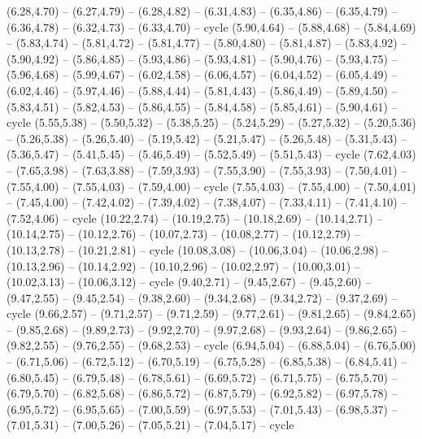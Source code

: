 \expandafter\def\csname geo:gebiet:DNK\endcsname{
  (6.28,4.70) -- (6.27,4.79) -- (6.28,4.82) -- (6.31,4.83) -- (6.35,4.86) -- (6.35,4.79) -- (6.36,4.78) -- (6.32,4.73) -- (6.33,4.70) -- cycle}
\expandafter\def\csname geo:gebiet:GBR\endcsname{
  (5.90,4.64) -- (5.88,4.68) -- (5.84,4.69) -- (5.83,4.74) -- (5.81,4.72) -- (5.81,4.77) -- (5.80,4.80) -- (5.81,4.87) -- (5.83,4.92) -- (5.90,4.92) -- (5.86,4.85) -- (5.93,4.86) -- (5.93,4.81) -- (5.90,4.76) -- (5.93,4.75) -- (5.96,4.68) -- (5.99,4.67) -- (6.02,4.58) -- (6.06,4.57) -- (6.04,4.52) -- (6.05,4.49) -- (6.02,4.46) -- (5.97,4.46) -- (5.88,4.44) -- (5.81,4.43) -- (5.86,4.49) -- (5.89,4.50) -- (5.83,4.51) -- (5.82,4.53) -- (5.86,4.55) -- (5.84,4.58) -- (5.85,4.61) -- (5.90,4.61) -- cycle}
\expandafter\def\csname geo:gebiet:ISL\endcsname{
  (5.55,5.38) -- (5.50,5.32) -- (5.38,5.25) -- (5.24,5.29) -- (5.27,5.32) -- (5.20,5.36) -- (5.26,5.38) -- (5.26,5.40) -- (5.19,5.42) -- (5.21,5.47) -- (5.26,5.48) -- (5.31,5.43) -- (5.36,5.47) -- (5.41,5.45) -- (5.46,5.49) -- (5.52,5.49) -- (5.51,5.43) -- cycle}
\expandafter\def\csname geo:gebiet:AZE\endcsname{
  (7.62,4.03) -- (7.65,3.98) -- (7.63,3.88) -- (7.59,3.93) -- (7.55,3.90) -- (7.55,3.93) -- (7.50,4.01) -- (7.55,4.00) -- (7.55,4.03) -- (7.59,4.00) -- cycle}
\expandafter\def\csname geo:gebiet:GEO\endcsname{
  (7.55,4.03) -- (7.55,4.00) -- (7.50,4.01) -- (7.45,4.00) -- (7.42,4.02) -- (7.39,4.02) -- (7.38,4.07) -- (7.33,4.11) -- (7.41,4.10) -- (7.52,4.06) -- cycle}
\expandafter\def\csname geo:gebiet:PHL\endcsname{
  (10.22,2.74) -- (10.19,2.75) -- (10.18,2.69) -- (10.14,2.71) -- (10.14,2.75) -- (10.12,2.76) -- (10.07,2.73) -- (10.08,2.77) -- (10.12,2.79) -- (10.13,2.78) -- (10.21,2.81) -- cycle
  (10.08,3.08) -- (10.06,3.04) -- (10.06,2.98) -- (10.13,2.96) -- (10.14,2.92) -- (10.10,2.96) -- (10.02,2.97) -- (10.00,3.01) -- (10.02,3.13) -- (10.06,3.12) -- cycle}
\expandafter\def\csname geo:gebiet:MYS\endcsname{
  (9.40,2.71) -- (9.45,2.67) -- (9.45,2.60) -- (9.47,2.55) -- (9.45,2.54) -- (9.38,2.60) -- (9.34,2.68) -- (9.34,2.72) -- (9.37,2.69) -- cycle
  (9.66,2.57) -- (9.71,2.57) -- (9.71,2.59) -- (9.77,2.61) -- (9.81,2.65) -- (9.84,2.65) -- (9.85,2.68) -- (9.89,2.73) -- (9.92,2.70) -- (9.97,2.68) -- (9.93,2.64) -- (9.86,2.65) -- (9.82,2.55) -- (9.76,2.55) -- (9.68,2.53) -- cycle}
\expandafter\def\csname geo:gebiet:BRN\endcsname{
  }
\expandafter\def\csname geo:gebiet:SVN\endcsname{
  }
\expandafter\def\csname geo:gebiet:FIN\endcsname{
  (6.94,5.04) -- (6.88,5.04) -- (6.76,5.00) -- (6.71,5.06) -- (6.72,5.12) -- (6.70,5.19) -- (6.75,5.28) -- (6.85,5.38) -- (6.84,5.41) -- (6.80,5.45) -- (6.79,5.48) -- (6.78,5.61) -- (6.69,5.72) -- (6.71,5.75) -- (6.75,5.70) -- (6.79,5.70) -- (6.82,5.68) -- (6.86,5.72) -- (6.87,5.79) -- (6.92,5.82) -- (6.97,5.78) -- (6.95,5.72) -- (6.95,5.65) -- (7.00,5.59) -- (6.97,5.53) -- (7.01,5.43) -- (6.98,5.37) -- (7.01,5.31) -- (7.00,5.26) -- (7.05,5.21) -- (7.04,5.17) -- cycle}
